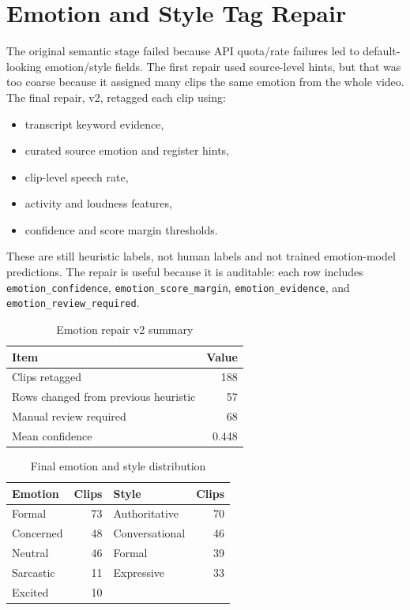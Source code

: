 \documentclass[11pt]{article}
\begin{document}
\section{Emotion and Style Tag Repair}

The original semantic stage failed because API quota/rate failures led to default-looking emotion/style fields. The first repair used source-level hints, but that was too coarse because it assigned many clips the same emotion from the whole video. The final repair, v2, retagged each clip using:

\begin{itemize}
    \item transcript keyword evidence,
    \item curated source emotion and register hints,
    \item clip-level speech rate,
    \item activity and loudness features,
    \item confidence and score margin thresholds.
\end{itemize}

These are still heuristic labels, not human labels and not trained emotion-model predictions. The repair is useful because it is auditable: each row includes \texttt{emotion\_confidence}, \texttt{emotion\_score\_margin}, \texttt{emotion\_evidence}, and \texttt{emotion\_review\_required}.

\begin{table}[H]
\centering
\caption{Emotion repair v2 summary}
\begin{tabular}{lr}
\toprule
\textbf{Item} & \textbf{Value} \\
\midrule
Clips retagged & 188 \\
Rows changed from previous heuristic & 57 \\
Manual review required & 68 \\
Mean confidence & 0.448 \\
\bottomrule
\end{tabular}
\end{table}

\begin{table}[H]
\centering
\caption{Final emotion and style distribution}
\begin{tabular}{lrlr}
\toprule
\textbf{Emotion} & \textbf{Clips} & \textbf{Style} & \textbf{Clips} \\
\midrule
Formal & 73 & Authoritative & 70 \\
Concerned & 48 & Conversational & 46 \\
Neutral & 46 & Formal & 39 \\
Sarcastic & 11 & Expressive & 33 \\
Excited & 10 & & \\
\bottomrule
\end{tabular}
\end{table}
\end{document}
